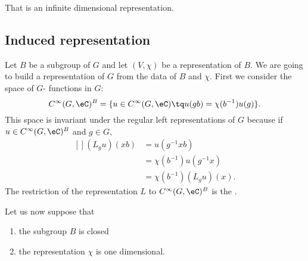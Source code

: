 That is an infinite dimensional representation.

\subsection{Induced representation}
\label{SubSecInducrepresBBGC}

Let $B$ be a subgroup of $G$ and let $(V,\chi)$ be a representation of $B$. We are going to build a representation of $G$ from the data of $B$ and $\chi$. First we consider the space of $G$- functions in $G$:
\begin{equation}
	C^{\infty}(G,\eC)^B=\{ u\in C^{\infty}(G,\eC)\tq u(gb)=\chi(b^{-1})u(g) \}.
\end{equation}
This space is invariant under the regular left representations of $G$ because if $u\in C^{\infty}(G,\eC)^B$ and $g\in G$,
\begin{equation}
	\begin{aligned}[]
		(L_gu)(xb) & =u(g^{-1}xb)            \\
		           & =\chi(b^{-1})u(g^{-1}x) \\
		           & =\chi(b^{-1})(L_gu)(x).
	\end{aligned}
\end{equation}
The restriction of the representation $L$ to $C^{\infty}(G,\eC)^B$ is the .

Let us now suppose that
\begin{enumerate}

	\item
	      the subgroup $B$ is closed
	\item
	      the representation $\chi$ is one dimensional.
\end{enumerate}

